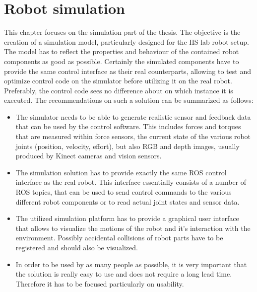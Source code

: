 
\chapter{Robot simulation}
\label{chap:simulation}

This chapter focuses on the simulation part of the thesis. The objective is the creation of a simulation model, particularly designed for the IIS lab robot setup. The model has to reflect the properties and behaviour of the contained robot components as good as possible. Certainly the simulated components have to provide the same control interface as their real counterparts, allowing to test and optimize control code on the simulator before utilizing it on the real robot. Preferably, the control code sees no difference about on which instance it is executed. The recommendations on such a solution can be summarized as follows: 

\begin{itemize}

\item
The simulator needs to be able to generate realistic sensor and feedback data that can be used by the control software. This includes forces and torques that are measured within force sensors, the current state of the various robot joints (position, velocity, effort), but also RGB and depth images, usually produced by Kinect cameras and vision sensors.

\item
The simulation solution has to provide exactly the same ROS control interface as the real robot. This interface essentially consists of a number of ROS topics, that can be used to send control commands to the various different robot components or to read actual joint states and sensor data.
 
\item
The utilized simulation platform has to provide a graphical user interface that allows to visualize the motions of the robot and it's interaction with the environment. Possibly accidental collisions of  robot parts have to be registered and should also be visualized.

\item
In order to be used by as many people as possible, it is very important that the solution is really easy to use and does not require a long lead time. Therefore it has to be focused particularly on usability.

\end{itemize}

